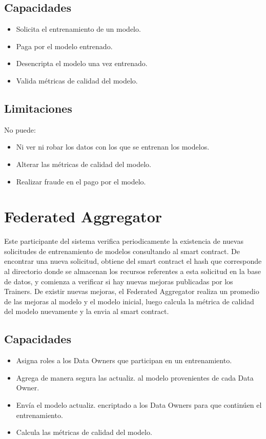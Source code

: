 \documentclass[
11pt, %
oneside, %
spanish, %
singlespacing, %
parskip, %
headsepline, %
chapterinoneline, %
]{MastersDoctoralThesis} %
\begin{document}
\subsection*{Capacidades}
\begin{itemize}
\item Solicita el entrenamiento de un modelo.
\item Paga por el modelo entrenado.
\item Desencripta el modelo una vez entrenado.
\item Valida métricas de calidad del modelo.
\end{itemize}

\subsection*{Limitaciones}
No puede:
\begin{itemize}
\item Ni ver ni robar los datos con los que se entrenan los modelos.
\item Alterar las métricas de calidad del modelo.
\item Realizar fraude en el pago por el modelo.
\end{itemize}



\section{Federated Aggregator}
Este participante del sistema verifica periodicamente la existencia de nuevas solicitudes de entrenamiento de modelos consultando al smart contract. De encontrar una nueva solicitud, obtiene del smart contract el hash que corresponde al directorio donde se almacenan los recursos referentes a esta solicitud en la base de datos, y comienza a verificar si hay nuevas mejoras publicadas por los Trainers. De existir nuevas mejoras, el Federated Aggregator realiza un promedio de las mejoras al modelo y el modelo inicial, luego calcula la métrica de calidad del modelo nuevamente y la envia al smart contract.

\subsection*{Capacidades}
\begin{itemize}
\item Asigna roles a los Data Owners que participan en un entrenamiento.
\item Agrega de manera segura las actualiz. al modelo provenientes de cada Data Owner.
\item Envía el modelo actualiz. encriptado a los Data Owners para que continúen el entrenamiento.
\item Calcula las métricas de calidad del modelo.
\end{itemize}
\end{document}

